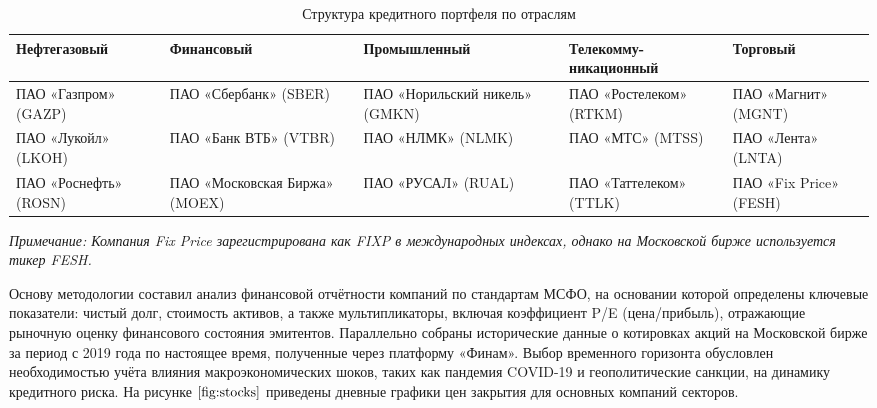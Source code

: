 \documentclass[]{article}
\begin{document}
\begin{table}[ht]
	\centering
	\caption{Структура кредитного портфеля по отраслям}
	\label{tab:portfolio}
	\footnotesize %
	\begin{tabularx}{\textwidth}{|X|X|X|X|X|}
		\hline
		\textbf{Нефтегазовый} & \textbf{Финансовый} & \textbf{Промышленный} & \textbf{Телекомму- \newline никационный} & \textbf{Торговый} \\
		\hline
		ПАО \newline«Газпром» \newline (GAZP)   & ПАО «Сбербанк» (SBER) & ПАО «Норильский никель» (GMKN) & ПАО «Ростелеком» (RTKM) & ПАО «Магнит» (MGNT) \\
		\hline
		ПАО «Лукойл» (LKOH)    & ПАО «Банк ВТБ» (VTBR) & ПАО «НЛМК» (NLMK) & ПАО «МТС» (MTSS) & ПАО «Лента» (LNTA) \\
		\hline
		ПАО «Роснефть» (ROSN)  & ПАО «Московская Биржа» (MOEX) & ПАО «РУСАЛ» (RUAL) & ПАО «Таттелеком» (TTLK) & ПАО «Fix Price» (FESH) \\
		\hline
	\end{tabularx}
	
	\vspace{2mm}
	\begin{minipage}{\textwidth}
		\footnotesize\itshape
		Примечание: Компания Fix Price зарегистрирована как FIXP в международных индексах, однако на Московской бирже используется тикер FESH.
	\end{minipage}
\end{table}
	
	
	Основу методологии составил анализ финансовой отчётности компаний по стандартам МСФО, на основании которой определены ключевые показатели: чистый долг, стоимость активов, а также мультипликаторы, включая коэффициент P/E (цена/прибыль), отражающие рыночную оценку финансового состояния эмитентов. Параллельно собраны исторические данные о котировках акций на Московской бирже за период с 2019 года по настоящее время, полученные через платформу «Финам». Выбор временного горизонта обусловлен необходимостью учёта влияния макроэкономических шоков, таких как пандемия COVID-19 и геополитические санкции, на динамику кредитного риска.
	На рисунке $\ref{fig:stocks}$ приведены дневные графики цен закрытия для основных компаний секторов.
	
\end{document}
